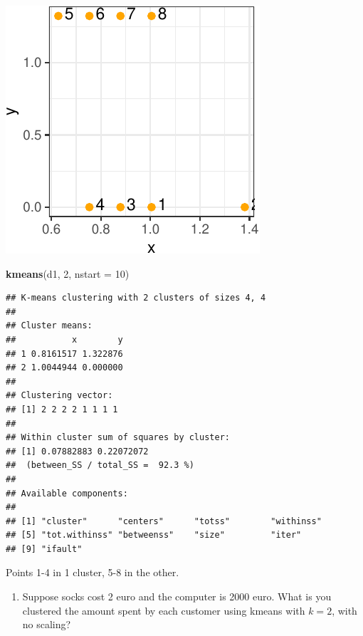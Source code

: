 \documentclass[]{article}
\newenvironment{Shaded}{\begin{snugshade}}{\end{snugshade}}
\newcommand{\DataTypeTok}[1]{\textcolor[rgb]{0.13,0.29,0.53}{#1}}
\newcommand{\DecValTok}[1]{\textcolor[rgb]{0.00,0.00,0.81}{#1}}
\newcommand{\KeywordTok}[1]{\textcolor[rgb]{0.13,0.29,0.53}{\textbf{#1}}}
\newcommand{\NormalTok}[1]{#1}
\providecommand{\tightlist}{%
  \setlength{\itemsep}{0pt}\setlength{\parskip}{0pt}}
\begin{document}
\begin{center}\includegraphics{sol_A1_files/figure-latex/unnamed-chunk-4-1} \end{center}

\begin{Shaded}
\begin{Highlighting}[]
\KeywordTok{kmeans}\NormalTok{(d1, }\DecValTok{2}\NormalTok{, }\DataTypeTok{nstart =} \DecValTok{10}\NormalTok{)}
\end{Highlighting}
\end{Shaded}

\begin{verbatim}
## K-means clustering with 2 clusters of sizes 4, 4
## 
## Cluster means:
##           x        y
## 1 0.8161517 1.322876
## 2 1.0044944 0.000000
## 
## Clustering vector:
## [1] 2 2 2 2 1 1 1 1
## 
## Within cluster sum of squares by cluster:
## [1] 0.07882883 0.22072072
##  (between_SS / total_SS =  92.3 %)
## 
## Available components:
## 
## [1] "cluster"      "centers"      "totss"        "withinss"    
## [5] "tot.withinss" "betweenss"    "size"         "iter"        
## [9] "ifault"
\end{verbatim}

Points 1-4 in 1 cluster, 5-8 in the other.

\begin{enumerate}
\def\labelenumi{\alph{enumi})}
\setcounter{enumi}{2}
\tightlist
\item
  Suppose socks cost 2 euro and the computer is 2000 euro. What is you
  clustered the amount spent by each customer using kmeans with
  \(k = 2\), with no scaling?
\end{enumerate}
\end{document}
